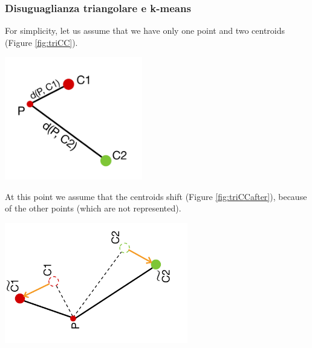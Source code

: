 \documentclass{report}
\begin{document}
\begin{minipage}[b]{0.48\textwidth}
  \subsubsection*{Disuguaglianza triangolare e k-means}
  For simplicity, let us assume that we have only one point and two centroids (Figure \ref{fig:triCC}).  

  \begin{center}
      \includegraphics[width = 0.45\textwidth]{imgs/triCC.png}
      \label{fig:triCC}
  \end{center}

  At this point we assume that the centroids shift (Figure \ref{fig:triCCafter}), because of the other points (which are not represented).

  \begin{center}
      \includegraphics[width = 0.6\textwidth]{imgs/triCCAfter.png}
      \label{fig:triCCafter}
  \end{center}   
\end{minipage}
\hspace{0.1in}
\end{document}
